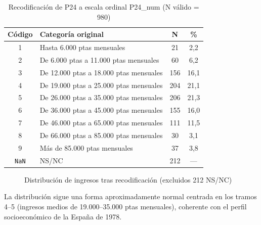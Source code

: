\documentclass[12pt,a4paper]{article}
\newcommand{\thead}[1]{\cellcolor{tableheader}\color{white}\textbf{#1}}
\begin{document}
\begin{table}[H]
\centering
\renewcommand{\arraystretch}{1.3}
\begin{tabularx}{\linewidth}{c X c c}
\toprule
\thead{Código} & \thead{Categoría original} & \thead{N} & \thead{\%} \\
\midrule
1 & Hasta 6.000 ptas mensuales            &  21 &  2,2 \\
\rowcolor{tablerow}
2 & De 6.000 ptas a 11.000 ptas mensuales &  60 &  6,2 \\
3 & De 12.000 ptas a 18.000 ptas mensuales & 156 & 16,1 \\
\rowcolor{tablerow}
4 & De 19.000 ptas a 25.000 ptas mensuales & 204 & 21,1 \\
5 & De 26.000 ptas a 35.000 ptas mensuales & 206 & 21,3 \\
\rowcolor{tablerow}
6 & De 36.000 ptas a 45.000 ptas mensuales & 155 & 16,0 \\
7 & De 46.000 ptas a 65.000 ptas mensuales & 111 & 11,5 \\
\rowcolor{tablerow}
8 & De 66.000 ptas a 85.000 ptas mensuales &  30 &  3,1 \\
9 & Más de 85.000 ptas mensuales           &  37 &  3,8 \\
\rowcolor{tablerow}
\texttt{NaN} & NS/NC                             & 212 &  --- \\
\bottomrule
\end{tabularx}
\caption{Recodificación de P24 a escala ordinal P24\_num (N válido = 980)}
\end{table}

\begin{figure}[H]
\centering
{}
\caption{Distribución de ingresos tras recodificación (excluidos 212 NS/NC)}
\end{figure}

La distribución sigue una forma aproximadamente normal centrada en los tramos 4--5 (ingresos medios de 19.000--35.000 ptas mensuales), coherente con el perfil socioeconómico de la España de 1978.
\end{document}
